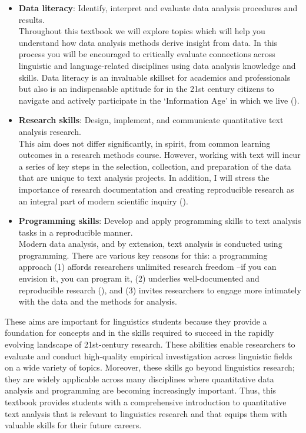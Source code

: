 \documentclass[
  letterpaper,
  krantz1]{latex/krantz-mod}
\theoremstyle{definition}
\theoremstyle{definition}
\theoremstyle{remark}
\begin{document}
\begin{itemize}
\item
  \textbf{Data literacy}: Identify, interpret and
  evaluate data analysis procedures and results.\\
  Throughout this textbook we will explore topics which will help you
  understand how data analysis methods derive insight from data. In this
  process you will be encouraged to critically evaluate connections
  across linguistic and language-related disciplines using data analysis
  knowledge and skills. Data literacy is an invaluable skillset for
  academics and professionals but also is an indispensable aptitude for
  in the 21st century citizens to navigate and actively participate in
  the `Information Age' in which we live
  ().
\item
  \textbf{Research skills}: Design, implement, and communicate
  quantitative text analysis research.\\
  This aim does not differ significantly, in spirit, from common
  learning outcomes in a research methods course. However, working with
  text will incur a series of key steps in the selection, collection,
  and preparation of the data that are unique to text analysis projects.
  In addition, I will stress the importance of research documentation
  and creating reproducible research as an integral part of modern
  scientific inquiry ().
\item
  \textbf{Programming skills}: Develop and apply programming skills to
  text analysis tasks in a reproducible manner.\\
  Modern data analysis, and by extension, text analysis is conducted
  using programming. There are various key reasons for this: a
  programming approach (1) affords researchers unlimited research
  freedom --if you can envision it, you can program it, (2) underlies
  well-documented and reproducible research
  (), and (3) invites
  researchers to engage more intimately with the data and the methods
  for analysis.
\end{itemize}

These aims are important for linguistics students because they provide a
foundation for concepts and in the skills required to succeed in the
rapidly evolving landscape of 21st-century research. These abilities
enable researchers to evaluate and conduct high-quality empirical
investigation across linguistic fields on a wide variety of topics.
Moreover, these skills go beyond linguistics research; they are widely
applicable across many disciplines where quantitative data analysis and
programming are becoming increasingly important. Thus, this textbook
provides students with a comprehensive introduction to quantitative text
analysis that is relevant to linguistics research and that equips them
with valuable skills for their future careers.
\end{document}
